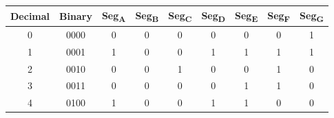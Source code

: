 \documentclass[12pt]{article}
\begin{document}
\begin{table}[ht]
  \centering
  \begin{tabular}{ | c | c | c | c | c | c | c | c | c | }
  \hline
  \textbf{Decimal}                                                       & \textbf{Binary}                                                         & \textbf{Seg\textsubscript{A}} & \textbf{Seg\textsubscript{B}} & \textbf{Seg\textsubscript{C}} & \textbf{Seg\textsubscript{D}} & \textbf{Seg\textsubscript{E}} & \textbf{Seg\textsubscript{F}} & \textbf{Seg\textsubscript{G}} \\ \hline
  0                                                                      & 0000                                                                    & 0                             & 0                             & 0                             & 0                             & 0                             & 0                             & 1                             \\ \hline
  1                                                                      & 0001                                                                    & 1                             & 0                             & 0                             & 1                             & 1                             & 1                             & 1                             \\ \hline
  2                                                                      & 0010                                                                    & 0                             & 0                             & 1                             & 0                             & 0                             & 1                             & 0                             \\ \hline
  3                                                                      & 0011                                                                    & 0                             & 0                             & 0                             & 0                             & 1                             & 1                             & 0                             \\ \hline
  4                                                                      & 0100                                                                    & 1                             & 0                             & 0                             & 1                             & 1                             & 0                             & 0                             \\ \hline

\end{tabular}
\end{table}
\end{document}
